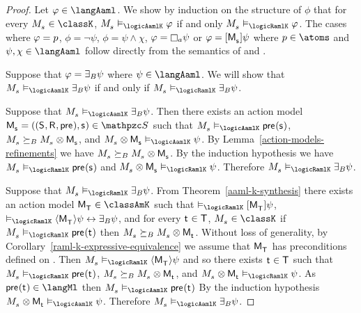 \begin{proof}
Let $\phi \in \langAaml$.
We show by induction on the structure of $\phi$ that for every $\kPModel{\kStateS} \in \classK$, $\kPModel{\kStateS} \entails_\logicAamlK \phi$ if and only $\kPModel{\kStateS} \entails_\logicRamlK \phi$.
The cases where $\varphi = p$, $\phi = \lnot \psi$,  $\phi = \psi \land \chi$, $\phi = \necessaryA \psi$ or $\phi = \actionA{\aPModel{\aStateS}} \psi$ where $\atomP \in \atoms$ and $\psi, \chi \in \langAaml$ follow directly from the semantics of \logicAamlK{} and \logicRamlK{}.

Suppose that $\varphi = {\exists_{B}} \psi$ where $\psi \in \langAaml$. 
We will show that $\kPModel{\kStateS} \entails_\logicAamlK \someactsBs \psi$ if and only if $\kPModel{\kStateS} \entails_\logicRamlK \someactsBs \psi$.

Suppose that $\kPModel{\kStateS} \entails_\logicAamlK \someactsBs \psi$.
Then there exists an action model $\aPModelAndTuple{\aStateS} \in \aSignatureFamily$ such that $\kPModel{\kStateS} \entails_\logicAamlK \aPrecondition(\aStateS)$, $\kPModel{\kStateS} \simulatesBs \kPModel{\kStateS} \exec \aPModel{\aStateS}$, and $\kPModel{\kStateS} \exec \aPModel{\aStateS} \entails_\logicAamlK \psi$.
By Lemma~\ref{action-models-refinements} we have $\kPModel{\kStateS} \simulatesBs \kPModel{\kStateS} \exec \aPModel{\aStateS}$.
By the induction hypothesis we have $\kPModel{\kStateS} \entails_\logicRamlK \aPrecondition(\aStateS)$ and $\kPModel{\kStateS} \exec \aPModel{\aStateS} \entails_\logicRamlK \psi$.
Therefore $\kPModel{\kStateS} \entails_\logicRamlK \someactsBs \psi$.

Suppose that $\kPModel{\kStateS} \entails_\logicRamlK \someactsBs \psi$.
From Theorem~\ref{aaml-k-synthesis} there exists an action model $\aPModel{\aStatesT} \in \classAmK$ such that 
$\entails_\logicRamlK \actionA{\aPModel{\aStatesT}} \psi$,
$\entails_\logicRamlK \actionE{\aPModel{\aStatesT}} \psi \iff \someactsBs \psi$, and
for every $\aStateT \in \aStatesT$, $\kPModel{\kStateS} \in \classK$ if $\kPModel{\kStateS} \entails_\logicRamlK \aPrecondition(\aStateT)$ then $\kPModel{\kStateS} \simulatesBs \kPModel{\kStateS} \exec \aPModel{\aStateT}$.
Without loss of generality, by Corollary~\ref{raml-k-expressive-equivalence} we assume that $\aPModel{\aStatesT}$ has preconditions defined on \langMl{}.
Then $\kPModel{\kStateS} \entails_\logicRamlK \actionE{\aPModel{\aStatesT}} \psi$ and so there exists $\aStateT \in \aStatesT$ such that $\kPModel{\kStateS} \entails_\logicRamlK \aPrecondition(\aStateT)$, $\kPModel{\kStateS} \simulatesBs \kPModel{\kStateS} \exec \aPModel{\aStateT}$, and $\kPModel{\kStateS} \exec \aPModel{\aStateT} \entails_\logicRamlK \psi$.
As $\aPrecondition(\aStateT) \in \langMl$ then $\kPModel{\kStateS} \entails_\logicAamlK \aPrecondition(\aStateT)$
By the induction hypothesis $\kPModel{\kStateS} \exec \aPModel{\aStateT} \entails_\logicAamlK \psi$.
Therefore $\kPModel{\kStateS} \entails_\logicAamlK \someactsBs \psi$.
\end{proof}
